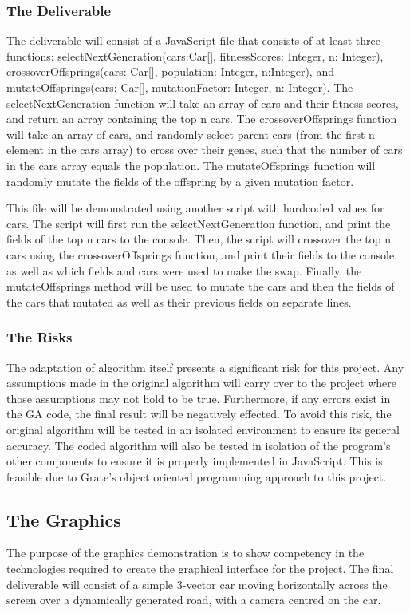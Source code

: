 \documentclass{article}
\begin{document}
\subsubsection{The Deliverable}
The deliverable will consist of a JavaScript file that consists of at least 
three functions: selectNextGeneration(cars:Car[], fitnessScores: Integer, n: 
Integer), crossoverOffsprings(cars: Car[], population: Integer, n:Integer), and 
mutateOffsprings(cars: Car[], mutationFactor: Integer, n: Integer). The 
selectNextGeneration function will take an array of cars and their fitness 
scores, and return an array containing the top n cars. The crossoverOffsprings 
function will take an array of cars, and randomly select parent cars (from the 
first n element in the cars array) to cross over their genes, such that the 
number of cars in the cars array equals the population. The mutateOffsprings 
function will randomly mutate the fields of the offspring by a given mutation 
factor.

This file will be demonstrated using another script with hardcoded values for 
cars. The script will first run the selectNextGeneration function, and print the 
fields of the top n cars to the console. Then, the script will crossover the top 
n cars using the crossoverOffsprings function, and print their fields to the 
console, as well as which fields and cars were used to make the swap. Finally, 
the mutateOffsprings method will be used to mutate the cars and then the fields 
of the cars that mutated as well as their previous fields on separate lines.

\subsubsection{The Risks}
The adaptation of algorithm itself presents a significant risk for this project. 
Any assumptions made in the original algorithm will carry over to the project 
where those assumptions may not hold to be true.  
\textcolor{RoyalPurple}{Furthermore}, if any errors 
exist in the GA code, the final result will be negatively effected. To avoid 
this risk, the original algorithm will be tested in an isolated 
\textcolor{RoyalPurple}{environment} to 
ensure its general accuracy. The coded algorithm will also be tested in 
isolation of the program's other components to ensure it is properly implemented 
in JavaScript. This is feasible due to \textcolor{RoyalPurple}{Grate's} object 
oriented programming 
approach to this project.

\subsection{The Graphics}
The purpose of the graphics demonstration is to show competency in the 
technologies required to create the graphical interface for the project. The 
final deliverable will consist of a simple 3-vector car moving horizontally 
across the screen over a dynamically generated road, with a camera centred on 
the car.
\end{document}
